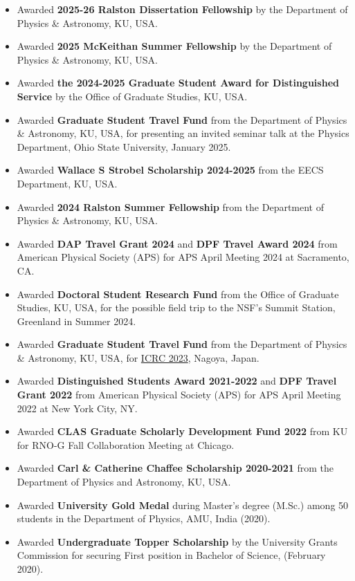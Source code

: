 \documentclass[10pt]{report}
\begin{document}
\begin{itemize}
\item Awarded \textbf{2025-26 Ralston Dissertation Fellowship} by the Department of Physics \& Astronomy, KU, USA.
\item Awarded \textbf{2025 McKeithan Summer Fellowship} by the Department of Physics \& Astronomy, KU, USA.
\item Awarded \textbf{the 2024-2025 Graduate Student Award for Distinguished Service} by the Office of Graduate Studies, KU, USA.
\item Awarded \textbf{Graduate Student Travel Fund}  from the Department of Physics \& Astronomy, KU, USA,  for presenting an invited seminar talk at the Physics Department, Ohio State University, January 2025.
\item Awarded \textbf{Wallace S Strobel Scholarship 2024-2025} from the EECS Department, KU, USA.
\item Awarded \textbf{2024 Ralston Summer Fellowship} from the Department of Physics \& Astronomy, KU, USA.
\item Awarded \textbf{DAP Travel Grant 2024} and \textbf{DPF Travel Award 2024} from American Physical Society (APS) for APS April Meeting 2024 at Sacramento, CA.
\item Awarded \textbf{Doctoral Student Research Fund}  from the Office of Graduate Studies, KU, USA,  for the possible field trip to the NSF's Summit Station, Greenland in Summer 2024.
\item Awarded \textbf{Graduate Student Travel Fund}  from the Department of Physics \& Astronomy, KU, USA,  for \href{https://www.icrc2023.org}{ICRC 2023}, Nagoya, Japan.
\item Awarded \textbf{Distinguished Students Award 2021-2022} and \textbf{DPF Travel Grant 2022} from American Physical Society (APS) for APS April Meeting 2022 at New York City, NY.
\item Awarded \textbf{CLAS Graduate Scholarly Development Fund 2022} from KU for RNO-G Fall Collaboration Meeting at Chicago.
\item Awarded \textbf{Carl \& Catherine Chaffee Scholarship 2020-2021} from the Department of Physics and Astronomy, KU, USA.
\item Awarded \textbf{University Gold Medal} during Master's degree (M.Sc.) among 50 students in the Department of Physics, AMU, India (2020).
\item Awarded \textbf{Undergraduate Topper Scholarship} by the University Grants Commission for securing First position in Bachelor of Science, (February 2020).

\end{itemize}
\end{document}
